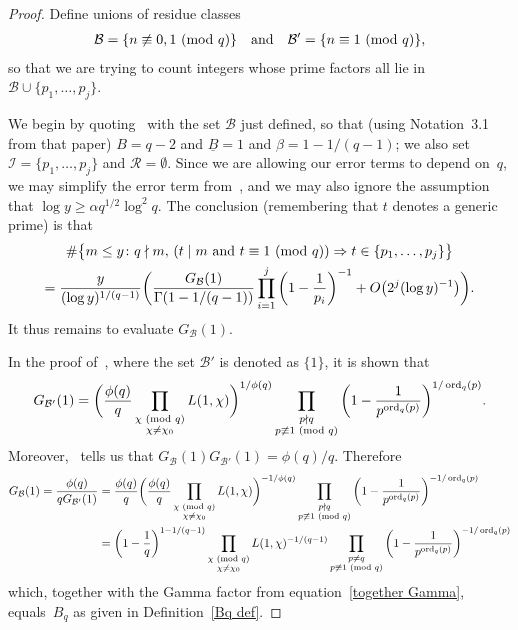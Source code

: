 \documentclass[12pt,reqno]{amsart}
\theoremstyle{definition}
\newcommand{\B}{{\mathcal B}}
\newcommand{\ord}{\mathop{\rm ord}}
\renewcommand{\mod}[1]{{\ifmmode\text{\rm\ (mod~$#1$)}\else\discretionary{}{}{\hbox{ }}\rm(mod~$#1$)\fi}}
\begin{document}
\begin{proof}
Define unions of residue classes
\begin{align*}
\B = \{n\not\equiv0,1\mod q\} \quad\text{and}\quad \B' = \{n\equiv1\mod q\},
\end{align*}
so that we are trying to count integers whose prime factors all lie in~$\B \cup \{p_1,\dots,p_j\}$.

We begin by quoting~\cite[Theorem~3.6]{CM} with the set $\B$ just defined, so that (using Notation~3.1 from that paper) $B=q-2$ and $\underline B=1$ and $\beta = 1-1/(q-1)$; we also set $\mathcal I=\{p_1,\dots,p_j\}$ and $\mathcal R=\emptyset$. Since we are allowing our error terms to depend on~$q$, we may simplify the error term from~\cite[Theorem~3.6]{CM}, and we may also ignore the assumption that $\log y \ge \alpha q^{1/2}\log^2 q$. The conclusion (remembering that $t$ denotes a generic prime) is that
\begin{multline}
\#\big\{ m\le y\colon q\nmid m,\, (t\mid m \text{ and }t\equiv 1\mod q) \Rightarrow t\in\{p_1,\ldots,p_j\} \big\} \\
= \frac y{(\log y)^{1/(q-1)}} \bigg( \frac{G_\B(1)}{\Gamma(1-1/(q-1))} \prod_{i=1}^j \bigg( 1-\frac1{p_i} \bigg)^{-1} + O\big( 2^j (\log y)^{-1} \big) \bigg). \label{together Gamma}
\end{multline}
It thus remains to evaluate $G_\B(1)$.

In the proof of~\cite[Proposition~4.1]{CM}, where the set $\B'$ is denoted as $\{1\}$, it is shown that
\begin{equation*}
G_{\B'}(1) = \bigg( \frac{\phi(q)}q \prod_{\substack{\chi\mod q \\ \chi \ne \chi_0}} L(1,\chi) \bigg)^{1/\phi(q)} \prod_{\substack{p \nmid q \\ p \not\equiv 1 \mod{q}}} \bigg(1-\frac{1}{p^{\ord_q(p)}} \bigg)^{1/\ord_q(p)}.
\end{equation*}
Moreover,~\cite[Remark~3.5]{CM} tells us that $G_\B(1) G_{\B'}(1) = \phi(q)/q$. Therefore
\begin{align*}
G_\B(1) = \frac{\phi(q)}{qG_{\B'}(1)} &= \frac{\phi(q)}q \bigg( \frac{\phi(q)}q \prod_{\substack{\chi\mod q \\ \chi \ne \chi_0}} L(1,\chi) \bigg)^{-1/\phi(q)} \prod_{\substack{p \nmid q \\ p \not\equiv 1 \mod{q}}} \bigg(1-\frac{1}{p^{\ord_q(p)}} \bigg)^{-1/\ord_q(p)} \\
&= \bigg( 1-\frac1q \bigg)^{1-1/(q-1)} \prod_{\substack{\chi\mod q \\ \chi \ne \chi_0}} L(1,\chi)^{-1/(q-1)} \prod_{\substack{p \ne q \\ p \not\equiv 1 \mod{q}}} \bigg(1-\frac{1}{p^{\ord_q(p)}} \bigg)^{-1/\ord_q(p)}
\end{align*}
which, together with the Gamma factor from equation~\eqref{together Gamma}, equals~$B_q$ as given in Definition~\ref{Bq def}.
\end{proof}
\end{document}
